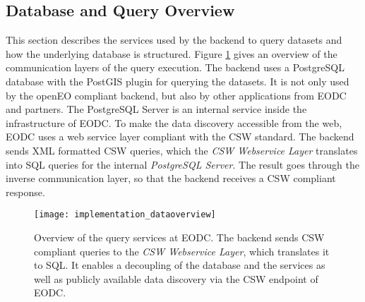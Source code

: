 \documentclass[draft,final]{vutinfth} %
\newcommand{\bgoesswein}[1]{{\color{blue}#1}}
\begin{document}
\bgoesswein{
\subsection{Database and Query Overview}
This section describes the services used by the backend to query datasets and how the underlying database is structured. Figure \ref{fig:implementation_dataoverview} gives an overview of the communication layers of the query execution. The backend uses a PostgreSQL database with the PostGIS plugin for querying the datasets. It is not only used by the openEO compliant backend, but also by other applications from EODC and partners. The PostgreSQL Server is an internal service inside the infrastructure of EODC. To make the data discovery accessible from the web, EODC uses a web service layer compliant with the CSW standard. The backend sends XML formatted CSW queries, which the \textit{CSW Webservice Layer} translates into SQL queries for the internal \textit{PostgreSQL Server}. The result goes through the inverse communication layer, so that the backend receives a CSW compliant response.  

\begin{figure}[h]
	\centering
	\texttt{[image: implementation\_dataoverview]}
	\caption{\bgoesswein{Overview of the query services at EODC. The backend sends CSW compliant queries to the \textit{CSW Webservice Layer}, which translates it to SQL. It enables a decoupling of the database and the services as well as publicly available data discovery via the CSW endpoint of EODC.}}
	\label{fig:implementation_dataoverview} %
\end{figure}

}
\end{document}
